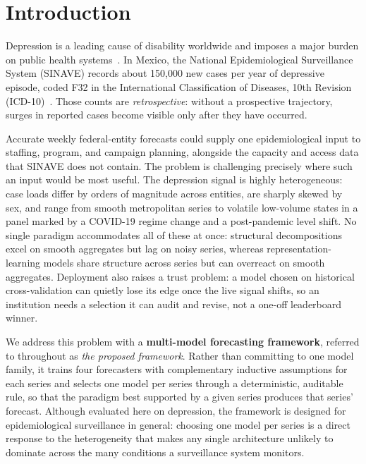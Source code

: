 \documentclass[runningheads]{llncs}
\begin{document}
\section{Introduction}
\label{sec:intro}

Depression is a leading cause of disability worldwide and imposes a major
burden on public health systems~\cite{santomauro2021}.
In Mexico, the National Epidemiological Surveillance System (SINAVE)
records about 150{,}000 new cases per year of depressive episode, coded
F32 in the International Classification of Diseases, 10th Revision
(\mbox{ICD-10})~\cite{sinave2026}. Those counts are \emph{retrospective}: without
a prospective trajectory, surges in reported cases become visible only
after they have occurred.

Accurate weekly federal-entity forecasts could supply one epidemiological
input to staffing, program, and campaign planning, alongside the capacity
and access data that SINAVE does not contain. The problem is challenging
precisely where such an input would be most useful. The depression signal is highly
heterogeneous: case loads differ by orders of magnitude across
entities, are sharply skewed by sex, and range from smooth
metropolitan series to volatile low-volume states in a panel marked
by a COVID-19 regime change and a post-pandemic level shift. No single
paradigm accommodates all of these at once: structural decompositions
excel on smooth aggregates but lag on noisy series, whereas
representation-learning models share structure across series but can
overreact on smooth aggregates. Deployment also raises a trust
problem: a model chosen on historical cross-validation can quietly lose
its edge once the live signal shifts, so an institution needs a
selection it can audit and revise, not a one-off leaderboard winner.

We address this problem with a \textbf{multi-model forecasting framework},
referred to throughout as \emph{the proposed framework}. Rather than
committing to one model
family, it trains four forecasters with complementary inductive
assumptions for each series and selects one model per series through a
deterministic, auditable rule, so that the paradigm best supported by
a given series produces that series' forecast. Although evaluated
here on depression, the framework is designed for epidemiological
surveillance in general: choosing one model per series is a direct
response to the heterogeneity that makes any single architecture
unlikely to dominate across the many conditions a surveillance system
monitors.
\end{document}
